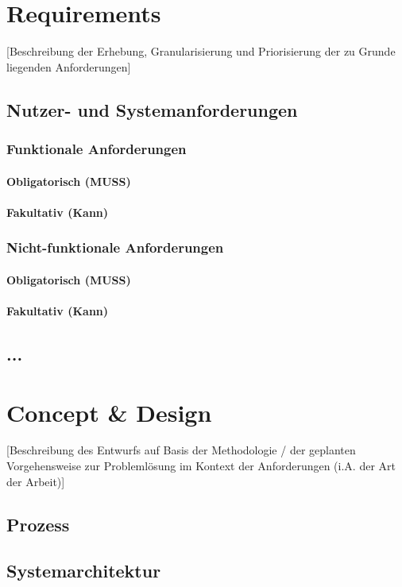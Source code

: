 \documentclass[oneside,bibliography=totocnumbered,BCOR=5mm]{scrbook}%
\theoremstyle{definition}
\theoremstyle{definition}
\theoremstyle{definition}
\theoremstyle{definition}
\theoremstyle{definition}
\theoremstyle{definition}
\begin{document}
\chapter{Requirements}
[Beschreibung der Erhebung, Granularisierung und Priorisierung der zu Grunde liegenden Anforderungen]
\section{Nutzer- und Systemanforderungen}
\subsection{Funktionale Anforderungen}
\subsubsection{Obligatorisch (MUSS)}
\subsubsection{Fakultativ (Kann)}
\subsection{Nicht-funktionale Anforderungen}

\subsubsection{Obligatorisch (MUSS)}
\subsubsection{Fakultativ (Kann)}
\section{...}




\chapter{Concept \& Design}
[Beschreibung des Entwurfs auf Basis der Methodologie / der geplanten Vorgehensweise zur Probleml\"osung im Kontext der Anforderungen (i.A. der Art der Arbeit)]
\section{Prozess}
\section{Systemarchitektur}
\end{document}
